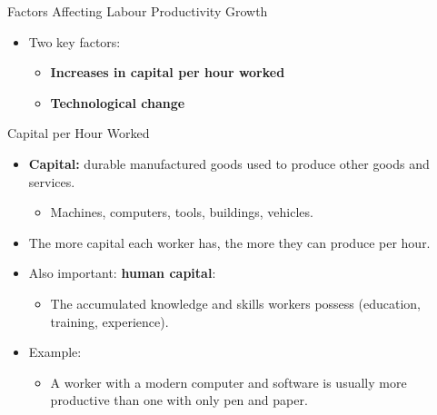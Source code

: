\documentclass[aspectratio=169]{beamer}
\begin{document}
\begin{frame}{Factors Affecting Labour Productivity Growth}
\transfade
\begin{itemize}[<+->]
  \item Two key factors:
  \begin{itemize}[<+->]
    \item \textbf{Increases in capital per hour worked}
    \item \textbf{Technological change}
  \end{itemize}
\end{itemize}
\end{frame}

\begin{frame}{Capital per Hour Worked}
\transfade
\begin{itemize}[<+->]
  \item \textbf{Capital:} durable manufactured goods used to produce other goods and services.
  \begin{itemize}[<+->]
    \item Machines, computers, tools, buildings, vehicles.
  \end{itemize}
  \item The more capital each worker has, the more they can produce per hour.
  \item Also important: \textbf{human capital}:
  \begin{itemize}[<+->]
    \item The accumulated \alert{knowledge and skills} workers possess (education, training, experience).
  \end{itemize}
  \item Example:
  \begin{itemize}[<+->]
    \item A worker with a modern computer and software is usually more productive than one with only pen and paper.
  \end{itemize}
\end{itemize}
\end{frame}
\end{document}

